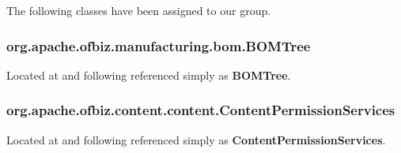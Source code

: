 The following classes have been assigned to our group.
\subsubsection*{org.apache.ofbiz.manufacturing.bom.BOMTree}
	Located at  and following referenced simply as \textbf{BOMTree}.
\subsubsection*{org.apache.ofbiz.content.content.ContentPermissionServices}
	Located at  and following referenced simply as \textbf{ContentPermissionServices}.
